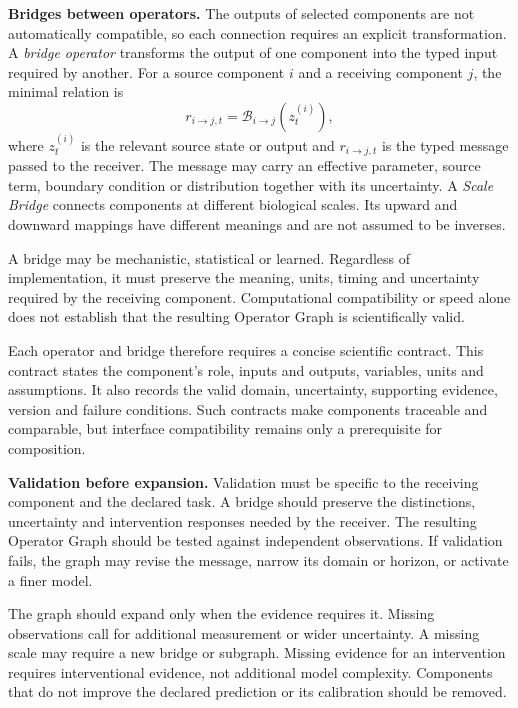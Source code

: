 \documentclass[12pt, letterpaper]{article} %
\begin{document}
\textbf{Bridges between operators.} The outputs of selected components are not automatically compatible, so each connection requires an explicit transformation. A \emph{bridge operator} transforms the output of one component into the typed input required by another. For a source component $i$ and a receiving component $j$, the minimal relation is
\begin{equation}
r_{i\rightarrow j,t}=\mathcal B_{i\rightarrow j}\!\left(z_t^{(i)}\right),
\label{eq:bridge}
\end{equation}
where $z_t^{(i)}$ is the relevant source state or output and $r_{i\rightarrow j,t}$ is the typed message passed to the receiver. The message may carry an effective parameter, source term, boundary condition or distribution together with its uncertainty. A \emph{Scale Bridge} connects components at different biological scales. Its upward and downward mappings have different meanings and are not assumed to be inverses.

A bridge may be mechanistic, statistical or learned. Regardless of implementation, it must preserve the meaning, units, timing and uncertainty required by the receiving component. Computational compatibility or speed alone does not establish that the resulting Operator Graph is scientifically valid.

Each operator and bridge therefore requires a concise scientific contract. This contract states the component's role, inputs and outputs, variables, units and assumptions. It also records the valid domain, uncertainty, supporting evidence, version and failure conditions. Such contracts make components traceable and comparable, but interface compatibility remains only a prerequisite for composition.

\textbf{Validation before expansion.} Validation must be specific to the receiving component and the declared task. A bridge should preserve the distinctions, uncertainty and intervention responses needed by the receiver. The resulting Operator Graph should be tested against independent observations. If validation fails, the graph may revise the message, narrow its domain or horizon, or activate a finer model.

The graph should expand only when the evidence requires it. Missing observations call for additional measurement or wider uncertainty. A missing scale may require a new bridge or subgraph. Missing evidence for an intervention requires interventional evidence, not additional model complexity. Components that do not improve the declared prediction or its calibration should be removed.
\end{document}
